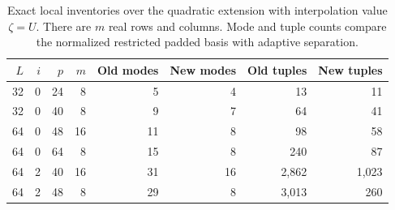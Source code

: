\begin{table}[htbp]
\centering\small
\begin{tabular}{@{}rrrrrrrr@{}}
\toprule
$L$ & $i$ & $p$ & $m$ & Old modes & New modes & Old tuples & New tuples\\\midrule
32 & 0 & 24 & 8 & 5 & 4 & 13 & 11\\
32 & 0 & 40 & 8 & 9 & 7 & 64 & 41\\
64 & 0 & 48 & 16 & 11 & 8 & 98 & 58\\
64 & 0 & 64 & 8 & 15 & 8 & 240 & 87\\
64 & 2 & 40 & 16 & 31 & 16 & 2,862 & 1,023\\
64 & 2 & 48 & 8 & 29 & 8 & 3,013 & 260\\
\bottomrule
\end{tabular}
\caption{Exact local inventories over the quadratic extension with interpolation value $\zeta=U$. There are $m$ real rows and columns. Mode and tuple counts compare the normalized restricted padded basis with adaptive separation.}
\end{table}
